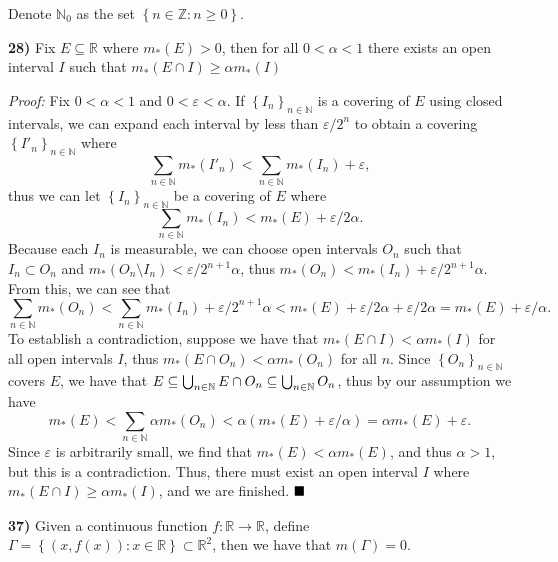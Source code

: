 \documentclass[12pt]{article}
\newcommand{\N}{\ensuremath{\mathbb{N}}}
\newcommand{\Z}{\ensuremath{\mathbb{Z}}}
\newcommand{\R}{\ensuremath{\mathbb{R}}}
\newcommand{\e}{\ensuremath{\varepsilon}}
\newcommand{\braceb}[1]{\left\{#1\right\}}
\newcommand{\sdiff}{\setminus}
\newcommand{\proof}{\textit{Proof: }}
\newcommand{\done}{\ensuremath{\strut\hfill\blacksquare}}
\begin{document}
\pagestyle{fancy}

\setlength{\parindent}{0in}
\setlength{\parskip}{0.1in}

Denote \( \N_0 \) as the set \( \braceb{n \in \Z : n \geq 0 } \).

\textbf{28)}
Fix \( E \subseteq \R \) where \( m_*(E) > 0 \), then for all
\( 0 < \alpha < 1 \) there exists an open interval \( I \) such that
\( m_*(E \cap I) \geq \alpha m_*(I) \)

\proof
Fix \( 0 < \alpha < 1 \) and \( 0 < \e < \alpha \).
If \( \braceb{I_n}_{n \in \N} \) is a covering of \( E \) using closed
intervals, we can expand each interval by less than \( \e/2^n \) to obtain a
covering \( \braceb{I'_n}_{n \in \N} \) where
\[
	\sum_{n \in \N} m_*(I'_n) < \sum_{n \in \N} m_*(I_n) + \e,
\]
thus we can let \( \braceb{I_n}_{n \in \N} \) be a covering of \( E \) where
\[
	\sum_{n \in \N} m_*(I_n) < m_*(E) + \e/2\alpha.
\]
Because each \( I_n \) is measurable, we can choose open
intervals \( O_n \) such that \( I_n \subset O_n \) and
\break
\( m_*(O_n \sdiff I_n) < \e/2^{n + 1}\alpha \), thus
\( m_*(O_n) < m_*(I_n) + \e/2^{n + 1}\alpha \).
From this, we can see that
\[
	\sum_{n \in \N} m_*(O_n)
	< \sum_{n \in \N} m_*(I_n) + \e/2^{n + 1}\alpha
	< m_*(E) + \e/2\alpha + \e/2\alpha
	= m_*(E) + \e/\alpha.
\]
To establish a contradiction, suppose we have that
\( m_*(E \cap I) < \alpha m_*(I) \) for all open intervals \( I \), thus
\( m_*(E \cap O_n) < \alpha m_*(O_n) \) for all \( n \).
Since \( \braceb{O_n}_{n \in \N} \) covers \( E \), we have that
\(
	E
	\subseteq \bigcup_{n \in \N} E \cap O_n
	\break
	\subseteq \bigcup_{n \in \N} O_n
\),
thus by our assumption we have
\[
	m_*(E)
	< \sum_{n \in \N} \alpha m_*(O_n)
	< \alpha(m_*(E) + \e/\alpha)
	= \alpha m_*(E) + \e.
\]
Since \( \e \) is arbitrarily small, we find that \( m_*(E) < \alpha m_*(E) \),
and thus \( \alpha > 1 \), but this is a contradiction.
Thus, there must exist an open interval \( I \) where
\( m_*(E \cap I) \geq \alpha m_*(I) \), and we are finished.
\done

\textbf{37)}
Given a continuous function \( f : \R \to \R \), define
\( \Gamma = \braceb{(x,f(x)) : x \in \R} \subset \R^2 \), then we have that
\( m(\Gamma) = 0 \).
\end{document}
